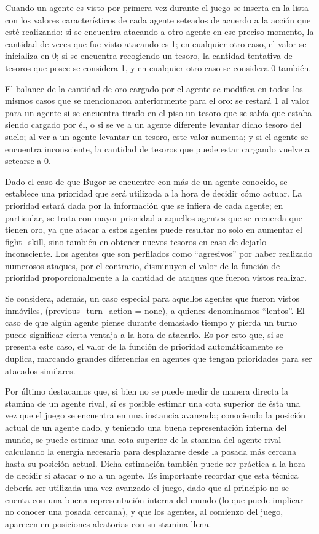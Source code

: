 \documentclass[a4paper,10pt,spanish]{article}
\begin{document}
	Cuando un agente es visto por primera vez durante el juego se inserta en la lista con los valores caracter\'isticos de cada agente seteados de acuerdo a la acci\'on que est\'e realizando: si se encuentra atacando a otro agente en ese preciso momento, la cantidad de veces que fue visto atacando es 1; en cualquier otro caso, el valor se inicializa en 0; si se encuentra recogiendo un tesoro, la cantidad tentativa de tesoros que posee se considera 1, y en cualquier otro caso se considera 0 tambi\'en.
	
	El balance de la cantidad de oro cargado por el agente se modifica en todos los mismos casos que se mencionaron anteriormente para el oro: se restar\'a 1 al valor para un agente si se encuentra tirado en el piso un tesoro que se sab\'ia que estaba siendo cargado por \'el, o si se ve a un agente diferente levantar dicho tesoro del suelo; al ver a un agente levantar un tesoro, este valor aumenta; y si el agente se encuentra inconsciente, la cantidad de tesoros que puede estar cargando vuelve a setearse a 0.
	
	Dado el caso de que Bugor se encuentre con m\'as de un agente conocido, se establece una prioridad que ser\'a utilizada a la hora de decidir c\'omo actuar. La prioridad estar\'a dada por la informaci\'on que se infiera de cada agente; en particular, se trata con mayor prioridad a aquellos agentes que se recuerda que tienen oro, ya que atacar a estos agentes puede resultar no solo en aumentar el fight\_skill, sino tambi\'en en obtener nuevos tesoros en caso de dejarlo inconsciente. Los agentes que son perfilados como ``agresivos'' por haber realizado numerosos ataques, por el contrario, disminuyen el valor de la funci\'on de prioridad proporcionalmente a la cantidad de ataques que fueron vistos realizar.
	
	Se considera, adem\'as, un caso especial para aquellos agentes que fueron vistos inm\'oviles, (previous\_turn\_action = none), a quienes denominamos ``lentos''. El caso de que alg\'un agente piense durante demasiado tiempo y pierda un turno puede significar cierta ventaja a la hora de atacarlo. Es por esto que, si se presenta este caso, el valor de la funci\'on de prioridad autom\'aticamente se duplica, marcando grandes diferencias en agentes que tengan prioridades para ser atacados similares.
	
	Por \'ultimo destacamos que, si bien no se puede medir de manera directa la stamina de un agente rival, s\'i es posible estimar una cota superior	de \'esta una vez que el juego se encuentra en una instancia avanzada; conociendo la posici\'on actual de un agente dado, y teniendo una buena representaci\'on interna del mundo, se puede estimar una cota superior de la stamina del agente rival calculando la energ\'ia necesaria para desplazarse desde la posada m\'as cercana hasta su posici\'on actual. Dicha estimaci\'on tambi\'en puede ser pr\'actica a la hora de decidir si atacar o no a un agente. Es importante recordar que esta t\'ecnica deber\'ia ser utilizada una vez avanzado el juego, dado que al principio no se cuenta con una buena representaci\'on interna del mundo (lo que puede implicar no conocer una posada cercana), y que los agentes, al comienzo del juego, aparecen en posiciones aleatorias con su stamina llena.
	
\end{document}
